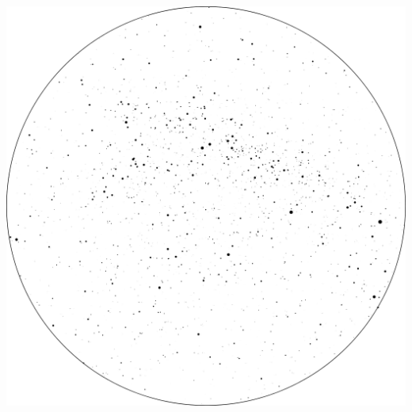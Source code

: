 \documentclass{SAS-class-skygen}
\begin{document}
	\vspace{0.5cm}
    \begin{center}
    \includegraphics[width=\textwidth]{./pics/sky_chart6.png}
    \end{center}
    
    
\end{document}
